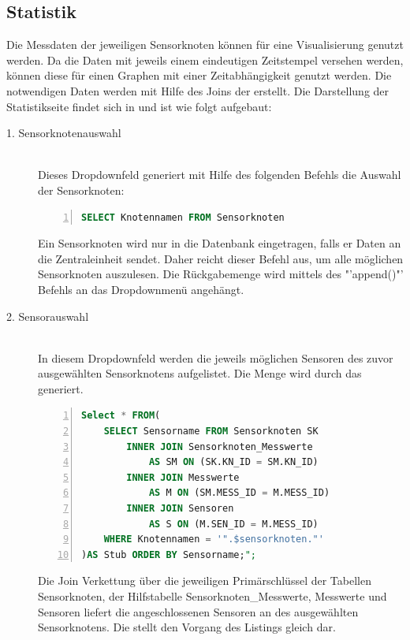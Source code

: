 \newpage
\subsection{Statistik}\label{Statistik}
	Die Messdaten der jeweiligen Sensorknoten können für eine Visualisierung genutzt werden. Da die Daten mit jeweils einem eindeutigen Zeitstempel versehen werden, können diese für einen Graphen mit einer Zeitabhängigkeit genutzt werden. Die notwendigen Daten werden mit Hilfe des Joins der  erstellt.
	Die Darstellung der Statistikseite findet sich in 
	und ist wie folgt aufgebaut:
	\begin{description}
		\item[1. Sensorknotenauswahl] \hfill \\
			Dieses Dropdownfeld generiert mit Hilfe des folgenden Befehls die Auswahl der Sensorknoten:
\begin{lstlisting}[caption=SQL Selektion der Möglichen Sensorknoten,frame=single,numbers=left,language=SQL]
	SELECT Knotennamen FROM Sensorknoten
\end{lstlisting}
			Ein Sensorknoten wird nur in die Datenbank eingetragen, falls er Daten an die Zentraleinheit sendet. Daher reicht dieser Befehl aus, um alle möglichen Sensorknoten auszulesen. Die Rückgabemenge wird mittels des "'append()"' Befehls an das Dropdownmenü angehängt.
		\item[2. Sensorauswahl] \hfill \\
			In diesem Dropdownfeld werden die jeweils möglichen Sensoren des zuvor ausgewählten Sensorknotens aufgelistet. Die Menge wird durch das  generiert.
			\newpage
\begin{lstlisting}[label={Sensorauswahl:Statistik},caption=Auswahl der Sensoren auf der Statistikseite,frame=single,numbers=left,language=SQL]
Select * FROM(
	SELECT Sensorname FROM Sensorknoten SK
		INNER JOIN Sensorknoten_Messwerte 
			AS SM ON (SK.KN_ID = SM.KN_ID)
		INNER JOIN Messwerte 
			AS M ON (SM.MESS_ID = M.MESS_ID)
		INNER JOIN Sensoren 
			AS S ON (M.SEN_ID = M.MESS_ID)
	WHERE Knotennamen = '".$sensorknoten."'
)AS Stub ORDER BY Sensorname;";
\end{lstlisting}
	Die Join Verkettung über die jeweiligen Primärschlüssel der Tabellen Sensorknoten, der Hilfstabelle Sensorknoten\_Messwerte, Messwerte und Sensoren liefert die angeschlossenen Sensoren an des ausgewählten Sensorknotens. Die  stellt den Vorgang des Listings gleich dar.


\end{description}

